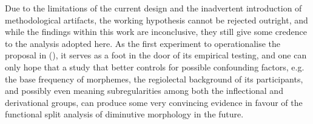 Due to the limitations of the current design and the inadvertent introduction of methodological artifacts, the working hypothesis cannot be rejected outright, and while the findings within this work are inconclusive, they still give some credence to the analysis adopted here. As the first experiment to operationalise the proposal in \citeauthor{DeBelder+etal+2014} (\citeyear{DeBelder+etal+2014}), it serves as a foot in the door of its empirical testing, and one can only hope that a study that better controls for possible confounding factors, e.g. the base frequency of morphemes, the regiolectal background of its participants, and possibly even meaning subregularities among both the inflectional and derivational groups, can produce some very convincing evidence in favour of the functional split analysis of diminutive morphology in the future.